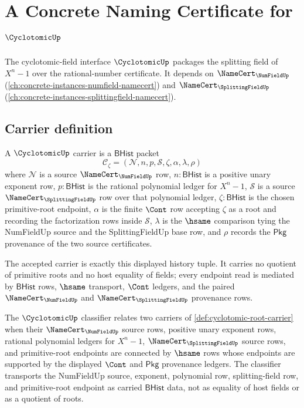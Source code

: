 \chapter{A Concrete Naming Certificate for $\CyclotomicUp$}
\label{ch:concrete-instances-cyclotomic-namecert}

The cyclotomic-field interface $\CyclotomicUp$ packages the splitting field of $X^n - 1$ over the rational-number certificate. It depends on $\NameCert_{\NumFieldUp}$ (\autoref{ch:concrete-instances-numfield-namecert}) and $\NameCert_{\SplittingFieldUp}$ (\autoref{ch:concrete-instances-splittingfield-namecert}).

\section{Carrier definition}
\label{sec:cyclotomic-carrier}

\begin{definition}
\label{def:cyclotomic-root-carrier}
A $\CyclotomicUp$ carrier is a $\mathsf{BHist}$ packet
$$
\mathcal{C}_{\zeta}=(\mathcal{N},n,p,\mathcal{S},\zeta,\alpha,\lambda,\rho)
$$
where $\mathcal{N}$ is a source $\NameCert_{\NumFieldUp}$ row, $n:\mathsf{BHist}$ is a positive unary exponent row, $p:\mathsf{BHist}$ is the rational polynomial ledger for $X^n-1$, $\mathcal{S}$ is a source $\NameCert_{\SplittingFieldUp}$ row over that polynomial ledger, $\zeta:\mathsf{BHist}$ is the chosen primitive-root endpoint, $\alpha$ is the finite $\Cont$ row accepting $\zeta$ as a root and recording the factorization rows inside $\mathcal{S}$, $\lambda$ is the $\hsame$ comparison tying the NumFieldUp source and the SplittingFieldUp base row, and $\rho$ records the $\mathsf{Pkg}$ provenance of the two source certificates.

The accepted carrier is exactly this displayed history tuple. It carries no quotient of primitive roots and no host equality of fields; every endpoint read is mediated by $\mathsf{BHist}$ rows, $\hsame$ transport, $\Cont$ ledgers, and the paired $\NameCert_{\NumFieldUp}$ and $\NameCert_{\SplittingFieldUp}$ provenance rows.
\end{definition}

\begin{definition}
\label{def:cyclotomic-rational-polynomial-classifier}
The $\CyclotomicUp$ classifier relates two carriers of \autoref{def:cyclotomic-root-carrier} when their $\NameCert_{\NumFieldUp}$ source rows, positive unary exponent rows, rational polynomial ledgers for $X^n-1$, $\NameCert_{\SplittingFieldUp}$ source rows, and primitive-root endpoints are connected by $\hsame$ rows whose endpoints are supported by the displayed $\Cont$ and $\mathsf{Pkg}$ provenance ledgers. The classifier transports the NumFieldUp source, exponent, polynomial row, splitting-field row, and primitive-root endpoint as carried $\mathsf{BHist}$ data, not as equality of host fields or as a quotient of roots.
\end{definition}

